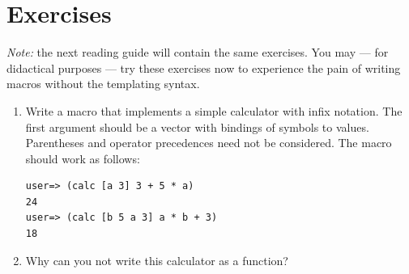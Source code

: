 \documentclass[11pt,a4paper]{article}
\begin{document}
\section{Exercises}

\emph{Note:} the next reading guide will contain the same exercises.
You may --- for didactical purposes --- try these exercises now 
to experience the pain of writing macros
without the templating syntax.

\begin{exercise}[Macro]
\begin{enumerate}[label=\alph*)]
\item
Write a macro that implements a simple calculator with infix notation. The first argument should be a vector with bindings of symbols to values. Parentheses and operator precedences need not be considered. The macro should work as follows:
\begin{verbatim}
user=> (calc [a 3] 3 + 5 * a)
24
user=> (calc [b 5 a 3] a * b + 3)
18
\end{verbatim}
\item Why can you not write this calculator as a function?
\end{enumerate}
\end{exercise}
\end{document}

